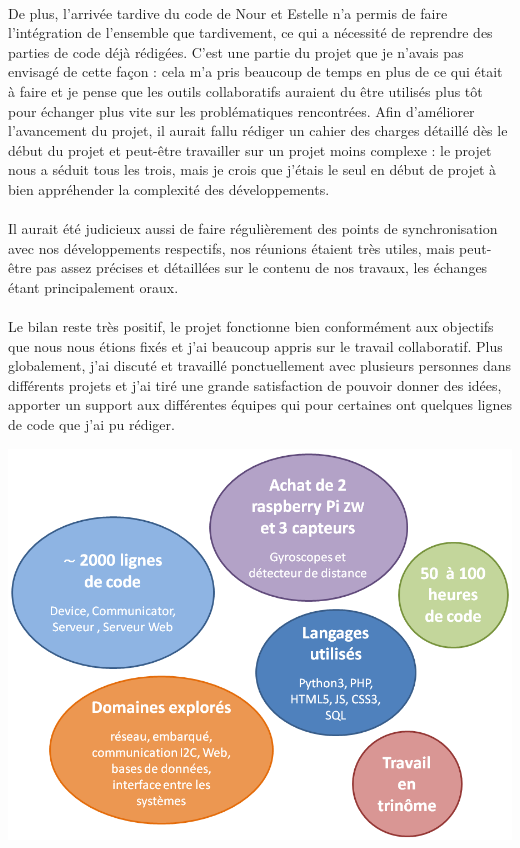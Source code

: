 \documentclass[12pt]{article}
\begin{document}
	\paragraph{}
	De plus, l'arrivée tardive du code de Nour et Estelle n'a permis de faire l'intégration de l'ensemble que tardivement, ce qui a nécessité de reprendre des parties de code déjà rédigées. C'est une partie du projet que je n'avais pas envisagé de cette façon : cela m'a pris beaucoup de temps en plus de ce qui était à faire et je pense que les outils collaboratifs auraient du être utilisés plus tôt pour échanger plus vite sur les problématiques rencontrées. Afin d'améliorer l'avancement du projet, il aurait fallu rédiger un cahier des charges détaillé dès le début du projet et peut-être travailler sur un projet moins complexe : le projet nous a séduit tous les trois, mais je crois que j'étais le seul en début de projet à bien appréhender la complexité des développements.
	
	\paragraph{}
	Il aurait été judicieux aussi de faire régulièrement des points de synchronisation avec nos développements respectifs, nos réunions étaient très utiles, mais peut-être pas assez précises et détaillées sur le contenu de nos travaux, les échanges étant principalement oraux.
	
	
	\paragraph{}
	Le bilan reste très positif, le projet fonctionne bien conformément aux objectifs que nous nous étions fixés et j'ai beaucoup appris sur le travail collaboratif. Plus globalement, j'ai discuté et travaillé ponctuellement avec plusieurs personnes dans différents projets et j'ai tiré une grande satisfaction de pouvoir donner des idées, apporter un support aux différentes équipes qui pour certaines ont quelques lignes de code que j'ai pu rédiger.
	
	\vspace{1cm}
	\noindent
	\includegraphics[width=\textwidth]{bilan}
	\vspace{1cm}
	
\end{document}
